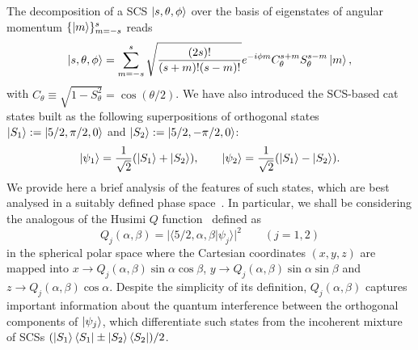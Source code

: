 The decomposition of a \ac{SCS} $\ket{s,\theta,\phi}$ over the basis of eigenstates of angular momentum $\{\ket{m}\}_{m=-s}^s$ reads
\begin{equation}
	\ket{s,\theta,\phi} =
	\sum^s_{m=-s}
		\sqrt{\frac{(2s)!}{(s+m)!(s-m)!}}
		e^{-i\phi m} C^{s+m}_\theta S^{s-m}_\theta \ket{m},
\end{equation}
with $C_\theta\equiv\sqrt{1-S^2_\theta}=\cos(\theta/2)$. We have also introduced the \ac{SCS}-based cat states built as the following superpositions of orthogonal states $\ket{S_1}:=\ket{5/2,\pi/2,0}$ and $\ket{S_2}:=\ket{5/2,-\pi/2,0}$:
\begin{equation}
\ket{\psi_{1}}=\frac{1}{\sqrt 2}(\ket{S_1}+\ket{S_2}),\qquad\ket{\psi_{2}}=\frac{1}{\sqrt 2}(\ket{S_1}-\ket{S_2}).
\end{equation}
We provide here a brief analysis of the features of such states, which are best analysed in a suitably defined phase space~\cite{agarwal1997atomic}. In particular, we shall be considering the analogous of the Husimi $Q$ function~\cite{walls2007quantum} defined as
\begin{equation}
\label{deco}
Q_j(\alpha,\beta)=\vert\langle{5/2,\alpha,\beta}\vert\psi_j\rangle\vert^2\qquad(j=1,2)
\end{equation}
in the spherical polar space where the Cartesian coordinates $(x,y,z)$ are mapped into $x\to Q_j(\alpha,\beta)\sin\alpha\cos\beta$, $y\to Q_j(\alpha,\beta)\sin\alpha\sin\beta$ and $z\to Q_j(\alpha,\beta)\cos\alpha$. Despite the simplicity of its definition, $Q_j(\alpha,\beta)$ captures important information about the quantum interference between the orthogonal components of $\ket{\psi_{j}}$, which differentiate such states from the incoherent mixture of \acp{SCS} $(\ket{S_1}\bra{S_1}\pm\ket{S_2}\bra{S_2})/2$. 

